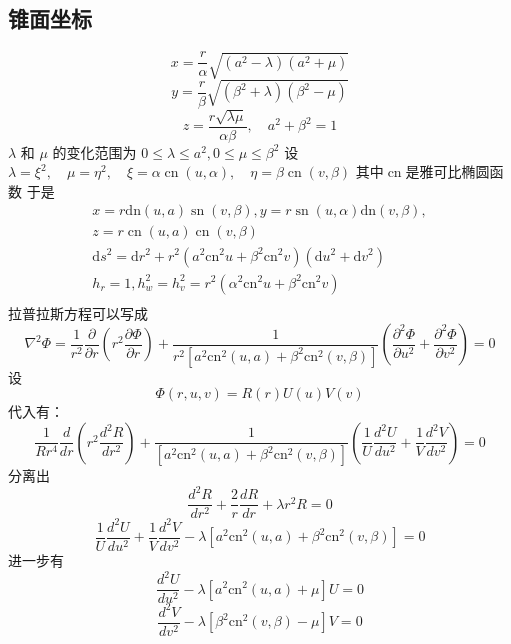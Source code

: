 \documentclass[a4paper]{ctexart}
\begin{document}
\subsection{锥面坐标}
\[
    x=\frac{r}{\alpha} \sqrt{\left(a^{2}-\lambda\right)\left(a^{2}+\mu\right)}
\]
\[
    y=\frac{r}{\beta} \sqrt{\left(\beta^{2}+\lambda\right)\left(\beta^{2}-\mu\right)}
\]
\[
    z=\frac{r \sqrt{\lambda \mu}}{\alpha \beta}, \quad a^{2}+\beta^{2}=1
\]
$\lambda$ 和 $\mu$ 的变化范围为 $0 \leqslant \lambda \leqslant a^{2}, 0 \leqslant \mu \leqslant \beta^{2}$
设$\lambda=\xi^{2}, \quad \mu=\eta^{2}, \quad \xi=\alpha \operatorname{cn}(u, \alpha), \quad \eta=\beta \operatorname{cn}(v, \beta)$
其中$\operatorname{cn}$是雅可比椭圆函数
于是
$$\begin{array}{c}
        x=r \mathrm{dn}(u, a) \operatorname{sn}(v, \beta), y=r \operatorname{sn}(u, \alpha) \mathrm{dn}(v, \beta),                                            \\
        z=r \operatorname{cn}(u, a) \operatorname{cn}(v, \beta)                                                                                               \\
        \mathrm{d} s^{2}=\mathrm{d} r^{2}+r^{2}\left(a^{2} \mathrm{cn}^{2} u+\beta^{2} \mathrm{cn}^{2} v\right)\left(\mathrm{d} u^{2}+\mathrm{d} v^{2}\right) \\
        h_{r}=1, h_{w}^{2}=h_{v}^{2}=r^{2}\left(\alpha^{2} \mathrm{cn}^{2} u+\beta^{2} \mathrm{cn}^{2} v\right)                                               \\
    \end{array}
$$
拉普拉斯方程可以写成
$$
    \nabla^{2} \Phi=\frac{1}{r^{2}} \frac{\partial}{\partial r}\left(r^{2} \frac{\partial \Phi}{\partial r}\right)+\frac{1}{r^{2}\left[a^{2} \mathrm{cn}^{2}(u, a)+\beta^{2} \mathrm{cn}^{2}(v, \beta)\right]}\left(\frac{\partial^{2} \Phi}{\partial u^{2}}+\frac{\partial^{2} \Phi}{\partial v^{2}}\right)=0
$$
设
$$
    \Phi \left( r,u,v \right) =R\left( r \right) U\left( u \right) V\left( v \right)
$$
代入有：
$$
    \frac{1}{Rr^4}\frac{d}{dr}\left( r^2\frac{d^2R}{dr^2} \right) +\frac{1}{\left[ a^2\text{cn}^2\left( u,a \right) +\beta ^2\text{cn}^2\left( v,\beta \right) \right]}\left( \frac{1}{U}\frac{d^2U}{du^2}+\frac{1}{V}\frac{d^2V}{dv^2} \right) =0
$$
分离出
\begin{equation}
    \frac{d^2R}{dr^2}+\frac{2}{r}\frac{dR}{dr}+\lambda r^2R=0
\end{equation}
$$
    \frac{1}{U}\frac{d^2U}{du^2}+\frac{1}{V}\frac{d^2V}{dv^2}-\lambda \left[ a^2\text{cn}^2\left( u,a \right) +\beta ^2\text{cn}^2\left( v,\beta \right) \right] =0
$$
进一步有
\begin{equation}
    \frac{d^2U}{du^2}-\lambda \left[ a^2\text{cn}^2\left( u,a \right) +\mu \right] U=0
\end{equation}
\begin{equation}
    \frac{d^2V}{dv^2}-\lambda \left[ \beta ^2\text{cn}^2\left( v,\beta \right) -\mu \right] V=0
\end{equation}
\end{document}
